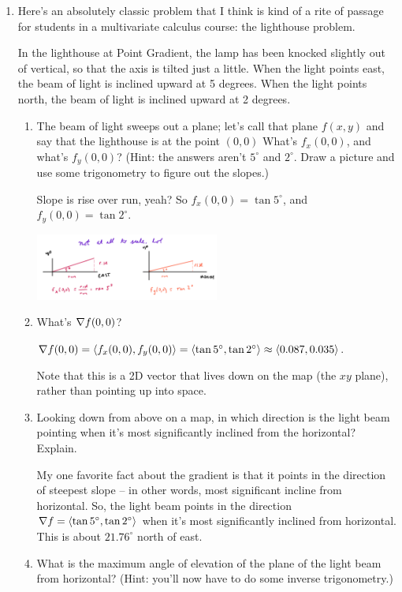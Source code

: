 \begin{enumerate}[leftmargin=0pt]
    \item Here's an absolutely classic problem that I think is kind of a rite of passage for students in a multivariate calculus course: the lighthouse problem.
    
    In the lighthouse at Point Gradient, the lamp has been knocked slightly out of vertical, so that the axis is tilted just a little. When the light points east, the beam of light is inclined upward at 5 degrees. When the light points north, the beam of light is inclined upward at 2 degrees.
    
    \begin{enumerate}
        \item The beam of light sweeps out a plane; let's call that plane $f(x, y)$ and say that the lighthouse is at the point $(0, 0)$ What's $f_x(0, 0)$, and what's $f_y(0, 0)$? (Hint: the answers aren't $5^\circ$ and $2^\circ$. Draw a picture and use some trigonometry to figure out the slopes.)
        
        \begin{red}
        Slope is rise over run, yeah? So $f_x(0, 0) = \tan 5^\circ$, and  $f_y(0, 0) = \tan 2^\circ$.
        
        \begin{center}
        \includegraphics[width=0.5\textwidth]{../images/triangles.png}
        \end{center}
        \end{red}
        \item What's $\nabla f(0, 0)$? 
        
        \begin{red}
        $\nabla f(0, 0) = \langle f_x(0, 0), f_y(0, 0) \rangle = \langle \tan 5^\circ, \tan 2^\circ\rangle \approx \langle 0.087, 0.035\rangle$. 
        
        Note that this is a 2D vector that lives down on the map (the $xy$ plane), rather than pointing up into space.
        \end{red}
        \item Looking down from above on a map, in which direction is the light beam pointing when it's most significantly inclined from the horizontal? Explain. 
        
        \begin{red}
        My one favorite fact about the gradient is that it points in the direction of steepest slope -- in other words, most significant incline from horizontal. So, the light beam points in the direction $\nabla f = \langle \tan 5^\circ, \tan 2^\circ\rangle$ when it's most significantly inclined from horizontal. This is about $21.76^\circ$ north of east.
        \end{red}
        \item What is the maximum angle of elevation of the plane of the light beam from horizontal? (Hint: you'll now have to do some inverse trigonometry.) 
        

\end{enumerate}
\end{enumerate}
